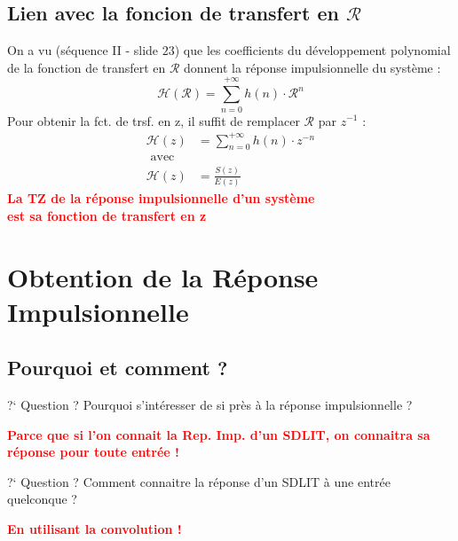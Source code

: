 \documentclass[a4paper,11pt]{beamer}
\begin{document}
\subsection{Lien avec la foncion de transfert en $\mathcal{R}$}
\begin{frame}
\justifying
On a vu (séquence II - slide \no$23$) que les coefficients du développement
polynomial de la fonction de transfert en $\mathcal{R}$ donnent la réponse
impulsionnelle du système :
$$
\mathcal{H}(\mathcal{R}) = \sum_{n=0}^{+\infty} h(n) \cdot \mathcal{R}^{n}
$$
Pour obtenir la fct. de trsf. en z, il suffit de remplacer $\mathcal{R}$
par $z^{-1}$ :
$$
\begin{aligned}
\mathcal{H}(z) &= \sum_{n=0}^{+\infty} h(n) \cdot z^{-n}\\
\text{ avec }\\
\mathcal{H}(z) &= \frac{S(z)}{E(z)}
\end{aligned}
$$
\pause
\centering
\textbf{
\textcolor{red}{La TZ de la réponse impulsionnelle d'un système\\
est sa fonction de transfert en z} }
\end{frame} 

\section[Obtention de la Rép. Imp.]{Obtention de la Réponse Impulsionnelle}  
\subsection{Pourquoi et comment ?}
\begin{frame}
\begin{exampleblock}{?` Question ?}
\centering
Pourquoi s'intéresser de si près à la réponse impulsionnelle ?
\end{exampleblock}
\pause
\centering
\textcolor{red}{\textbf{Parce que si l'on connait la Rep. Imp. d'un SDLIT, on
connaitra sa réponse pour toute entrée !}}
\pause
\begin{exampleblock}{?` Question ?}
\centering
Comment connaitre la réponse d'un SDLIT à une entrée quelconque ?
\end{exampleblock}
\pause
\centering
\textcolor{red}{\textbf{En utilisant la convolution !}}
\end{frame}
\end{document}
